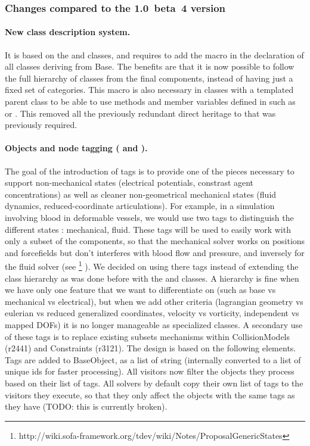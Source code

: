 \subsubsection{Changes compared to the 1.0~beta~4 version}\label{sec:design-core-objectmodel-changes}

\paragraph{New class description system.}
It is based on the  and  classes, and requires to add the  macro in the declaration of all classes deriving from Base.
The benefits are that it is now possible to follow the full hierarchy of classes from the final components, instead of having just a fixed set of categories.
This macro is also necessary in classes with a templated parent class to be able to use methods and member variables defined in  such as  or . This removed all the previously redundant direct heritage to  that was previously required.

\paragraph{Objects and node tagging ( and ).}
The goal of the introduction of tags is to provide one of the pieces necessary to support non-mechanical states (electrical potentials, constrast agent concentrations) as well as cleaner non-geometrical mechanical states (fluid dynamics, reduced-coordinate articulations).
For example, in a simulation involving blood in deformable vessels, we would use two tags to distinguish the different states : mechanical, fluid.
These tags will be used to easily work with only a subset of the components, so that the mechanical solver works on positions and forcefields but don't interferes with blood flow and pressure, and inversely for the fluid solver (see \footnote{http://wiki.sofa-framework.org/tdev/wiki/Notes/ProposalGenericStates} ).
We decided on using there tags instead of extending the class hierarchy as was done before with the  and  classes.
A hierarchy is fine when we have only one feature that we want to differentiate on (such as base vs mechanical vs electrical), but when we add other criteria (lagrangian geometry vs eulerian vs reduced generalized coordinates, velocity vs vorticity, independent vs mapped DOFs) it is no longer manageable as specialized classes.
A secondary use of these tags is to replace existing subsets mechanisms within CollisionModels (r2441) and Constraints (r3121).
The design is based on the following elements.
Tags are added to BaseObject, as a list of string (internally converted to a list of unique ids for faster processing).
All visitors now filter the objects they process based on their list of tags.
All solvers by default copy their own list of tags to the visitors they execute, so that they only affect the objects with the same tags as they have (TODO: this is currently broken). 

